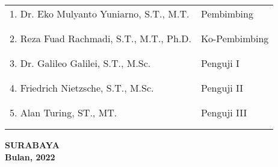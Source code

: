   \begingroup
    \setlength{\tabcolsep}{0pt}

    \noindent
    \begin{tabularx}{\textwidth}{X l}
      1. Dr. Eko Mulyanto Yuniarno, S.T., M.T.          & Pembimbing \\
      &  \\
      &  \\
      2. Reza Fuad Rachmadi, S.T., M.T., Ph.D.     & Ko-Pembimbing \\
      &  \\
      &  \\
      3. Dr. Galileo Galilei, S.T., M.Sc.  & Penguji I \\
      &  \\
      &  \\
      4. Friedrich Nietzsche, S.T., M.Sc.  & Penguji II \\
      &  \\
      &  \\
      5. Alan Turing, ST., MT.             & Penguji III \\
      &  \\
      &  \\
    \end{tabularx}
  \endgroup

  \vspace{12ex}




  \begin{center}
    \textbf{SURABAYA\\Bulan, 2022}
  \end{center}
\endgroup

